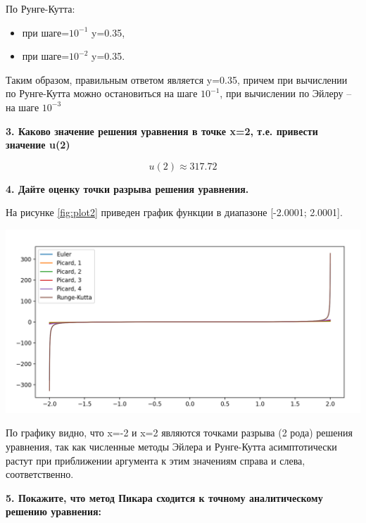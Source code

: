 \documentclass[12pt]{report}
\begin{document}
По Рунге-Кутта: 
\begin{itemize}
	\item при шаге=$10^{-1}$ y=0.35, 
	\item при шаге=$10^{-2}$ y=0.35. 
\end{itemize}

Таким образом, правильным ответом является y=0.35, причем при вычислении по Рунге-Кутта можно остановиться на шаге $10^{-1}$, при вычислении по Эйлеру -- на шаге $10^{-3}$

\textbf{3.  Каково значение решения уравнения в точке x=2, т.е. привести значение u(2)}


\begin{equation}
	u(2) \approx 317.72
\end{equation}

\textbf{4. Дайте оценку точки разрыва решения уравнения.}

На рисунке \ref{fig:plot2} приведен график функции в диапазоне [-2.0001; 2.0001].

\includegraphics[scale=0.6]{img/plot2}\label{fig:plot2}

По графику видно, что x=-2 и x=2 являются точками разрыва (2 рода) решения уравнения, так как численные методы Эйлера и Рунге-Кутта асимптотически растут при приближении аргумента к этим значениям справа и слева, соответственно.

\textbf{5. Покажите, что метод Пикара сходится к точному аналитическому решению уравнения:}
\end{document}
